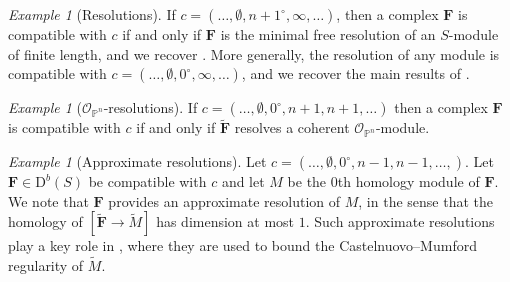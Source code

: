 \documentclass[12pt]{amsart}
\theoremstyle{definition}
\theoremstyle{remark}
\newtheorem{example}[lemma]{Example}
\newcommand{\PP}{\mathbb{P}}
\newcommand{\cc}{c}
\newcommand{\cO}{\mathcal{O}}
\newcommand{\FF}{\mathbf{F}}
\newcommand{\zp}{\circ}
\newcommand{\nothing}{\emptyset}
\newcommand{\DD}{\mathrm{D}}
\begin{document}
\begin{example}[Resolutions]\label{ex:resolutions}
 If  $\cc=(\dots, \nothing, n+1^\zp, \infty, \dots)$, then a complex $\FF$ is compatible with $\cc$ if and only if $\FF$ is the minimal free resolution of an $S$-module of finite length, and we recover \cite[Theorem~0.2]{eis-schrey1}. More generally, the resolution of any module is compatible with
$\cc=(\dots, \nothing, 0^\zp, \infty, \dots)$, and we recover the main results of \cite{boij-sod2}. 
\end{example}


\begin{example}[$\cO_{\PP^n}$-resolutions]\label{ex:sheaf resolutions}
If $\cc=(\dots,\nothing,0^{\zp},n+1,n+1,\dots)$ then a complex $\FF$ is compatible with $\cc$ if and only if $\widetilde{\FF}$ resolves a coherent $\cO_{\PP^n}$-module.
\end{example}


\begin{example}[Approximate resolutions]
Let $\cc=(\dots,\nothing,0^\zp,n-1,n-1,\dots,)$.   Let $\FF\in \DD^b(S)$ be compatible with $\cc$ and let $M$ be the $0$th homology module of $\FF$.  We note that $\FF$ provides an approximate resolution of $M$, in the sense that the homology of $[\widetilde{\FF}\to \widetilde{M}]$ has dimension at most $1$.  Such approximate resolutions play a key role in \cite[Lemma~1.6]{gruson-lazarsfeld-peskine}, where they are used to bound the Castelnuovo--Mumford regularity of $\widetilde{M}$.
\end{example}
\end{document}
